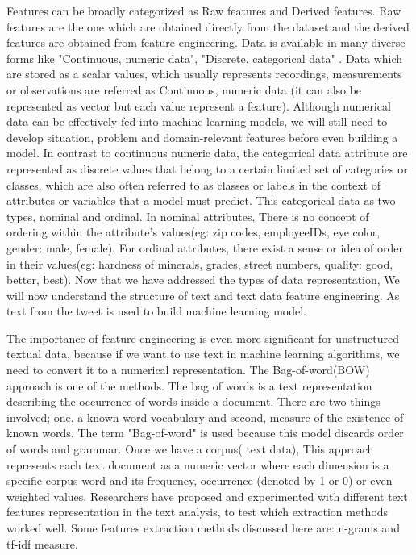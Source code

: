 Features can be broadly categorized as Raw features and Derived features. Raw features are the one which are obtained directly from the dataset and the derived features are obtained from feature engineering. Data is available in many diverse forms like "Continuous, numeric data", "Discrete, categorical data" . Data which are stored as a scalar values, which usually represents recordings, measurements or observations are referred as Continuous, numeric data (it can also be represented as vector but each value represent a feature). Although numerical data can be effectively fed into machine learning models, we will still need to develop situation, problem and domain-relevant features before even building a model. In contrast to continuous numeric data, the categorical data attribute are represented as discrete values that belong to a certain limited set of categories or classes. which are also often referred to as classes or labels in the context of attributes or variables that a model must predict. This categorical data as two types, nominal and ordinal. In nominal attributes, There is no concept of ordering within the attribute's values(eg: zip codes, employeeIDs, eye color, gender: {male, female}). For ordinal attributes, there exist a sense or idea of order in their values(eg: hardness of minerals, grades, street numbers, quality: {good, better,
best}). Now that we have addressed the types of data representation, 
We will now understand the structure of text and text data feature engineering. As text from the tweet is used to build machine learning model. 

The importance of feature engineering is even more significant for unstructured textual data, because if we want to use text in machine learning algorithms, we need to convert it to a numerical representation. The Bag-of-word(BOW) approach is one of the methods. The bag of words is a text representation describing the occurrence of words inside a document. There are two things involved; one, a known word vocabulary and second, measure of the existence of known words. The term "Bag-of-word" is used because this model discards order of words and grammar.  Once we have a corpus( text data), This approach represents each text document as a numeric vector where each dimension is a specific corpus word and its frequency, occurrence (denoted by 1 or 0) or even weighted values. Researchers have proposed and experimented with different text features representation in the text analysis, to test which extraction methods worked well. Some features extraction methods discussed here are:  n-grams and tf-idf measure.

